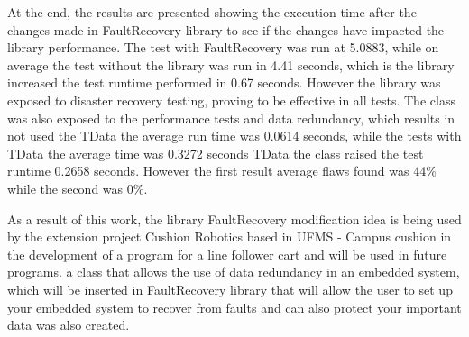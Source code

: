 At the end, the results are presented showing the execution time after the changes made in FaultRecovery library to see if the changes have impacted the library performance. The test with FaultRecovery was run at 5.0883, while on average the test without the library was run in 4.41 seconds, which is the library increased the test runtime performed in 0.67 seconds. However the library was exposed to disaster recovery testing, proving to be effective in all tests. The class was also exposed to the performance tests and data redundancy, which results in not used the TData the average run time was 0.0614 seconds, while the tests with TData the average time was 0.3272 seconds TData the class raised the test runtime 0.2658 seconds. However the first result average flaws found was 44\% while the second was 0\%.

As a result of this work, the library FaultRecovery modification idea is being used by the extension project Cushion Robotics based in UFMS - Campus cushion in the development of a program for a line follower cart and will be used in future programs. a class that allows the use of data redundancy in an embedded system, which will be inserted in FaultRecovery library that will allow the user to set up your embedded system to recover from faults and can also protect your important data was also created.


